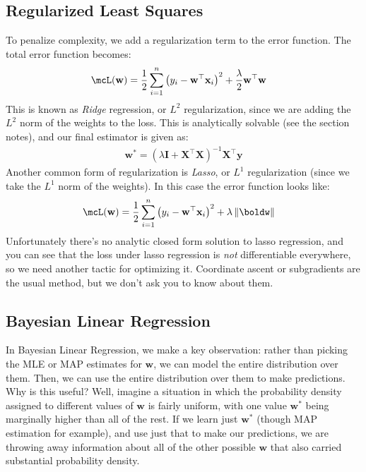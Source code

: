 \documentclass[12pt,letterpaper]{article}
\newcommand{\1}{\mathbbm{1}}
\begin{document}
\subsection{Regularized Least Squares}
To penalize complexity, we add a regularization term to the error function. The total error function becomes:
\begin{align}
    \mcL(\mathbf{w})&= \dfrac{1}{2}\sum_{i=1}^n\left(y_i-\mathbf{w}^\top\mathbf{x}_i\right)^2 + \dfrac{\lambda}{2}\mathbf{w}^\top\mathbf{w}
\end{align}
This is known as \textit{Ridge} regression, or $L^2$ regularization, since we are adding the $L^2$ norm of the weights to the loss. This is analytically solvable (see the section notes), and our final estimator is given as:
\begin{align}
    \mathbf{w}^* = (\lambda\mathbf{I}+\mathbf{X}^\top\mathbf{X})^{-1}\mathbf{X}^\top\mathbf{y}
\end{align}
Another common form of regularization is \textit{Lasso}, or $L^1$ regularization (since we take the $L^1$ norm of the weights). In this case the error function looks like:
\begin{align}
    \mcL(\mathbf{w})&= \dfrac{1}{2}\sum_{i=1}^n\left(y_i-\mathbf{w}^\top\mathbf{x}_i\right)^2 + \lambda \left\lVert\boldw\right\rVert
\end{align}
Unfortunately there's no analytic closed form solution to lasso regression, and you can see that the loss under lasso regression is \emph{not} differentiable everywhere, so we need another tactic for optimizing it. Coordinate ascent or subgradients are the usual method, but we don't ask you to know about them.

\subsection{Bayesian Linear Regression}

In Bayesian Linear Regression, we make a key observation: rather than picking the MLE or MAP estimates for $\mathbf{w}$, we can model the entire distribution over them. Then, we can use the entire distribution over them to make predictions. \\

\noindent
Why is this useful? Well, imagine a situation in which the probability density assigned to different values of $\mathbf{w}$ is fairly uniform, with one value $\mathbf{w}^*$ being marginally higher than all of the rest. If we learn just $\mathbf{w}^*$ (though MAP estimation for example), and use just that to make our predictions, we are throwing away information about all of the other possible $\mathbf{w}$ that also carried substantial probability density.\\
\end{document}
